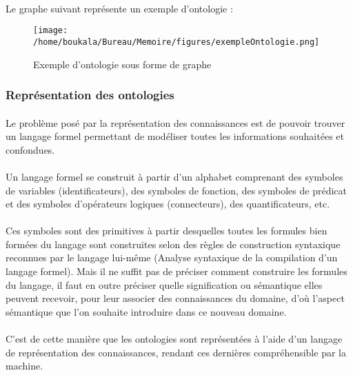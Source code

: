 \documentclass[12pt, a4paper, oneside]{book}
\begin{document}
\paragraph{}
Le graphe suivant représente un exemple d’ontologie :

\begin{figure}[h!]
\begin{center}
\texttt{[image: /home/boukala/Bureau/Memoire/figures/exempleOntologie.png]}
\caption{Exemple d'ontologie sous forme de graphe}
\end{center}
\end{figure}






\subsubsection{Représentation des ontologies}
\paragraph{}
Le problème posé par la représentation des connaissances est de pouvoir trouver un langage formel permettant de modéliser toutes les informations souhaitées et confondues.
\paragraph{}
Un langage formel se construit à partir d'un alphabet comprenant des symboles de variables (identificateurs), des symboles de fonction, des symboles de prédicat et des symboles d'opérateurs logiques (connecteurs), des quantificateurs, etc.
\paragraph{}
Ces symboles sont des primitives à partir desquelles toutes les formules bien formées du langage sont construites selon des règles de construction syntaxique reconnues par le langage lui-même (Analyse syntaxique de la compilation d'un langage formel). Mais il ne suffit pas de préciser comment construire les formules du langage, il faut en outre préciser quelle signification ou sémantique elles peuvent recevoir, pour leur associer des connaissances du domaine, d'où l'aspect sémantique que l'on souhaite introduire dans ce nouveau domaine.
\paragraph{}
C'est de cette manière que les ontologies sont représentées à l'aide d'un langage de représentation des connaissances, rendant ces dernières compréhensible par la machine.
\end{document}

